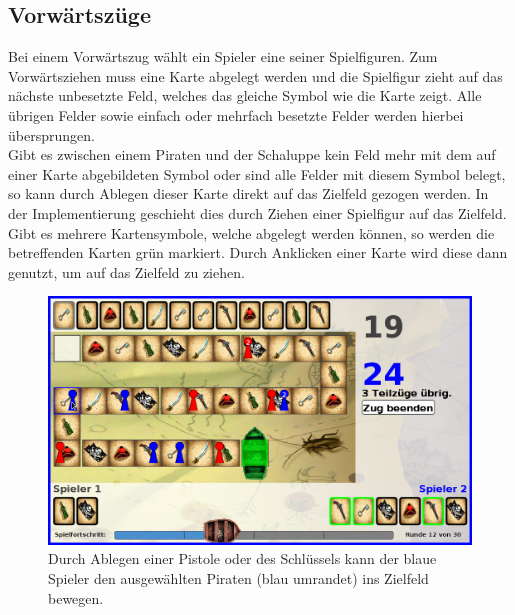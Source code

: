 \documentclass[a4paper, ngerman]{scrartcl}
\begin{document}
	
	
	\subsection{Vorwärtszüge}
	Bei einem Vorwärtszug wählt ein Spieler eine seiner
	Spiel\-figuren. Zum Vorwärtsziehen muss eine Karte
	abgelegt werden und die Spielfigur zieht auf das nächste unbesetzte Feld,
	welches das gleiche Symbol wie die Karte zeigt. Alle übrigen Felder sowie
	einfach oder mehrfach besetzte Felder werden hierbei übersprungen.\\
	Gibt es zwischen einem Piraten und der Schaluppe kein Feld mehr mit dem auf
	einer Karte abgebildeten Symbol oder sind alle Felder mit diesem Symbol
	belegt, so kann durch Ablegen dieser Karte direkt auf das Zielfeld gezogen
	werden. In der Implementierung geschieht dies durch Ziehen einer Spielfigur auf
	das Zielfeld. Gibt es mehrere Kartensymbole, welche abgelegt werden können, so
	werden die betreffenden Karten grün markiert. Durch Anklicken einer Karte wird
	diese dann genutzt, um auf das Zielfeld zu ziehen.
	
	\begin{figure}[h]
		\centering
		\includegraphics[scale = 0.3]{bilder/zielfeld}
		\caption{Durch Ablegen einer Pistole oder des Schlüssels kann der blaue
		Spieler den ausgewählten Piraten (blau umrandet) ins Zielfeld bewegen.}
		\label{fig:Zielfeld}
	\end{figure}
	 
\end{document}

